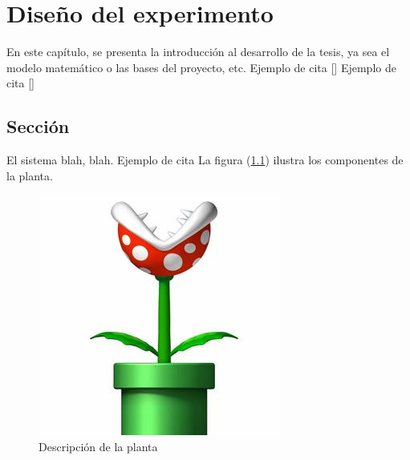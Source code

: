 

\chapter{Diseño del experimento}
En este capítulo, se presenta la introducción al desarrollo de la tesis, ya sea el modelo matemático o las bases del proyecto, etc.
Ejemplo de cita  [\citet{UDL:2019:Online}]
Ejemplo de cita [\citeauthor{FundGeInv}]





\section{Sección}
El sistema blah, blah. Ejemplo de cita \citep{UDL:2019:Online}
La figura (\ref{planta})                     %
 ilustra los componentes de la planta.

\begin{figure}
  \centering
    \includegraphics[scale=0.5]{./Capitulo3/figs/planta.jpg}      %
  \caption{Descripción de la planta}            %
  \label{planta}                            %
\end{figure}





